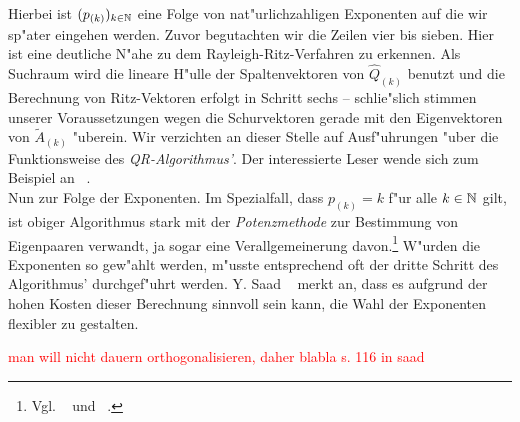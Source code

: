 Hierbei ist $(p_{(k)})_{k\in\mathbb{N}}$ eine Folge von nat"urlichzahligen Exponenten auf die wir sp"ater eingehen werden. Zuvor
begutachten wir die Zeilen vier bis sieben. Hier ist eine deutliche N"ahe zu dem Rayleigh-Ritz-Verfahren zu erkennen.
Als Suchraum wird die lineare H"ulle der Spaltenvektoren von $\hat{Q}_{(k)}$ benutzt und die Berechnung von Ritz-Vektoren erfolgt in Schritt sechs -- schlie"slich stimmen unserer Voraussetzungen wegen die Schurvektoren gerade mit den Eigenvektoren von $\widetilde{A}_{(k)}$ "uberein.
Wir verzichten an dieser Stelle auf Ausf"uhrungen "uber die Funktionsweise des \emph{QR-Algorithmus'}. Der interessierte Leser wende sich zum Beispiel an ~\cite[55 ff.]{stewart}.\\

Nun zur Folge der Exponenten. Im Spezialfall, dass $p_{(k)} = k$ f"ur alle $k\in\mathbb{N}$ gilt, ist obiger Algorithmus stark mit der \emph{Potenzmethode} zur Bestimmung von Eigenpaaren verwandt, ja sogar eine Verallgemeinerung davon.\footnote{Vgl. ~\cite[115 ff.]{saad} und ~\cite[1 f.]{kpt}.}
W"urden die Exponenten so gew"ahlt werden, m"usste entsprechend oft der dritte Schritt des Algorithmus' durchgef"uhrt werden.
Y. Saad ~\cite[116]{saad} merkt an, dass es aufgrund der hohen Kosten dieser Berechnung sinnvoll sein kann,
die Wahl der Exponenten flexibler zu gestalten.


\textcolor{red}{man will nicht dauern orthogonalisieren, daher blabla s. 116 in saad}





